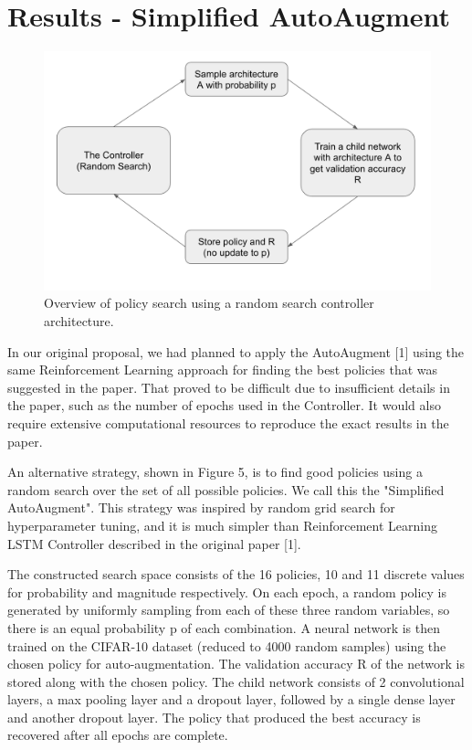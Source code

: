\documentclass[10pt,twocolumn,letterpaper]{article}
\begin{document}

\section{Results - Simplified AutoAugment}

\begin{figure}[bhp]
\includegraphics[width=\columnwidth]{random_search_arch.png}
\caption{Overview of policy search using a random search controller architecture.}
\end{figure}

In our original proposal, we had planned to apply the AutoAugment [1] using the same Reinforcement Learning approach for finding the best policies that was suggested in the paper.  That proved to be difficult due to insufficient details in the paper, such as the number of epochs used in the Controller.  It would also require extensive computational resources to reproduce the exact results in the paper.

An alternative strategy, shown in Figure 5, is to find good policies using a random search over the set of all possible policies. We call this the "Simplified AutoAugment".  This strategy was inspired by random grid search for hyperparameter tuning, and it is much simpler than Reinforcement Learning LSTM Controller described in the original paper [1].

The constructed search space consists of the 16 policies, 10 and 11 discrete values for probability and magnitude respectively.  On each epoch, a random policy is generated by uniformly sampling from each of these three random variables, so there is an equal probability p of each combination. A neural network is then trained on the CIFAR-10 dataset (reduced to 4000 random samples) using the chosen policy for auto-augmentation. The validation accuracy R of the network is stored along with the chosen policy. The child network consists of 2 convolutional layers, a max pooling layer and a dropout layer, followed by a single dense layer and another dropout layer. The policy that produced the best accuracy is recovered after all epochs are complete.
\end{document}
